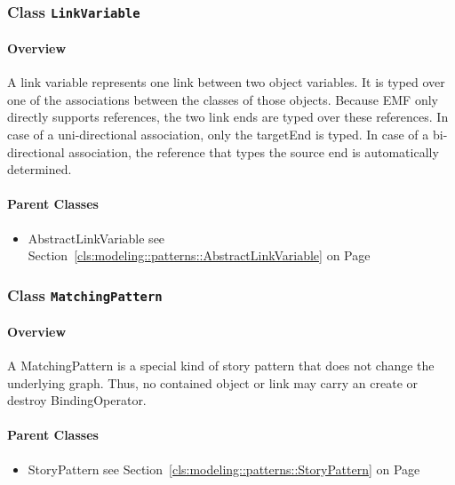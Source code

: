 \subsubsection{\Large{Class \bfseries \texttt{LinkVariable}\normalfont}}
\label{cls:modeling::patterns::LinkVariable} 
\paragraph{Overview}

	
			
A link variable represents one link between two object variables. It is typed over one of the associations between the classes of those objects. Because EMF only directly supports references, the two link ends are typed over these references. In case of a uni-directional association, only the targetEnd is typed. In case of a bi-directional association, the reference that types the source end is automatically determined.	
		
	



\paragraph{Parent Classes}
\begin{itemize}
\item AbstractLinkVariable see Section~\ref{cls:modeling::patterns::AbstractLinkVariable} on Page~\pageref{cls:modeling::patterns::AbstractLinkVariable}\end{itemize}
\subsubsection{\Large{Class \bfseries \texttt{MatchingPattern}\normalfont}}
\label{cls:modeling::patterns::MatchingPattern} 
\paragraph{Overview}

	
			
A MatchingPattern is a special kind of story pattern that does not change the underlying graph. Thus, no contained object or link may carry an create or destroy BindingOperator.	
		
	



\paragraph{Parent Classes}
\begin{itemize}
\item StoryPattern see Section~\ref{cls:modeling::patterns::StoryPattern} on Page~\pageref{cls:modeling::patterns::StoryPattern}\end{itemize}
